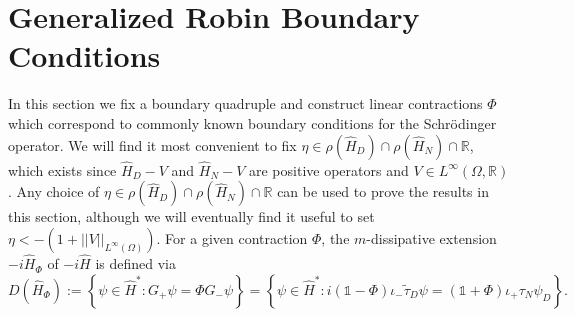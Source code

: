 \documentclass{article}
\numberwithin{equation}{section}
\begin{document}
\section{Generalized Robin Boundary Conditions}
In this section we fix a boundary quadruple and construct linear contractions $\Phi$ which correspond to commonly known boundary conditions for the Schr\"odinger operator. We will find it most convenient to fix $\eta \in \rho(\hat{H}_D)\cap \rho(\hat{H}_N)\cap \mathbb{R}$, which exists since $\hat{H}_D - V$ and $\hat{H}_N - V$ are positive operators and $V \in L^\infty(\Omega,\mathbb{R})$. Any choice of $\eta \in \rho(\hat{H}_D)\cap \rho(\hat{H}_N) \cap \mathbb{R}$ can be used to prove the results in this section, although we will eventually find it useful to set $\eta<-(1+||V||_{L^\infty(\Omega)})$. For a given contraction $\Phi$, the $m$-dissipative extension $-i\hat{H}_\Phi$ of $-i\hat{H}$ is defined via
\begin{equation}\label{H Phi Def}
        D(\hat{H}_\Phi):=\left\{\psi \in \hat{H}^*: G_+ \psi= \Phi G_-\psi \right\}= \left\{\psi \in \hat{H}^*: i(\mathds{1}-\Phi)\iota_-\tilde{\tau}_D \psi=(\mathds{1}+\Phi)\iota_+ \tau_N \psi_D \right\}.
    \end{equation}
\end{document}
